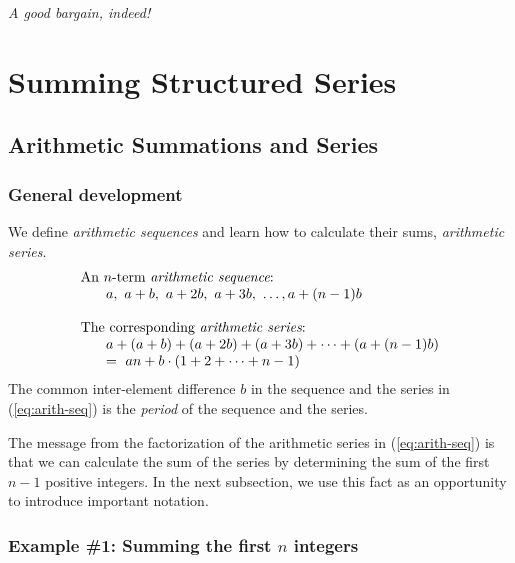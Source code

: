\noindent
{\em A good bargain, indeed!}



\section{Summing Structured Series}
\label{sec:structured-series}

\subsection{Arithmetic Summations and Series}
\label{sec:arithmetic-series}

\subsubsection{General development}

We define {\it arithmetic sequences} and learn how to calculate their sums, {\it arithmetic series}.
 
 
\begin{equation}
\label{eq:arith-seq}
\begin{array}{l}
\mbox{An $n$-term {\em arithmetic sequence}:} \\
\hspace*{.25in}a, \ a+b, \ a+2b, \ a+3b, \ \ldots, a+(n-1)b \\
  \\
\mbox{The corresponding {\em arithmetic series}:} \\
\hspace*{.25in}a + (a+b) + (a+2b) + (a+3b) + \cdots + (a+(n-1)b) \\
\hspace*{.25in} = \
an + b \cdot (1 + 2 + \cdots + n-1)
\end{array}
\end{equation}
The common inter-element difference $b$ in the sequence and the series in (\ref{eq:arith-seq}) is the {\it period} of the sequence and the series.
 
The message from the factorization of the arithmetic series in (\ref{eq:arith-seq}) is that we can calculate the sum of the series by determining the sum of the first $n-1$ positive integers.  In the next subsection, we use this fact as an opportunity to introduce important notation.

\subsubsection{Example \#1: Summing the first $n$ integers}
\label{sec:special-arithmetic-sums}

